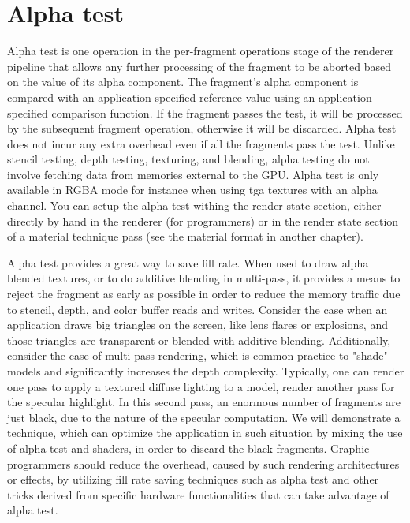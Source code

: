 \section{Alpha test}
Alpha test is one operation in the per-fragment operations stage of the renderer pipeline that
allows any further processing of the fragment to be aborted based on the value of its alpha component. The
fragment's alpha component is compared with an application-specified reference value
using an application-specified comparison function. If the fragment passes the test, it will
be processed by the subsequent fragment operation, otherwise it will be discarded. Alpha
test does not incur any extra overhead even if all the fragments pass the test. Unlike
stencil testing, depth testing, texturing, and blending, alpha testing do not involve
fetching data from memories external to the \ac{GPU}. Alpha test is only available in RGBA
mode for instance when using tga textures with an alpha channel. You can setup the alpha
test withing the render state section, either directly by hand in the renderer (for programmers)
or in the render state section of a material technique pass (see the material format in another chapter).

Alpha test provides a great way to save fill rate. When used to draw alpha blended
textures, or to do additive blending in multi-pass, it provides a means to reject the
fragment as early as possible in order to reduce the memory traffic due to stencil, depth,
and color buffer reads and writes.
Consider the case when an application draws big triangles on the screen, like lens
flares or explosions, and those triangles are transparent or blended with additive blending.
Additionally, consider the case of multi-pass rendering, which is common practice to
"shade" models and significantly increases the depth complexity. Typically, one can
render one pass to apply a textured diffuse lighting to a model, render another pass for the
specular highlight. In this second pass, an enormous number of fragments are just black,
due to the nature of the specular computation. We will demonstrate a technique, which
can optimize the application in such situation by mixing the use of alpha test and shaders,
in order to discard the black fragments.
Graphic programmers should reduce the overhead, caused by such rendering
architectures or effects, by utilizing fill rate saving techniques such as alpha test and
other tricks derived from specific hardware functionalities that can take advantage of
alpha test.


